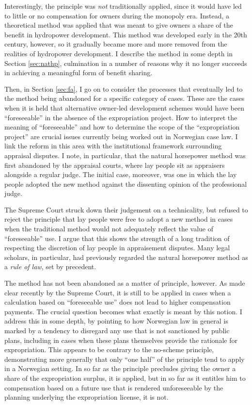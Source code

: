 Interestingly, the principle was {\it not} traditionally applied, since it would have led to little or no compensation for owners during the monopoly era. Instead, a theoretical method was applied that was meant to give owners a share of the benefit in hydropower development. This method was developed early in the 20th century, however, so it gradually became more and more removed from the realities of hydropower development. I describe the method in some depth in Section \ref{sec:nathp}, culmination in a number of reasons why it no longer succeeds in achieving a meaningful form of benefit sharing.

Then, in Section \ref{sec:fa}, I go on to consider the processes that eventually led to the method being abandoned for a specific category of cases. These are the cases when it is held that alternative owner-led development schemes would have been ``foreseeable'' in the absence of the expropriation project. How to interpret the meaning of ``foreseeable'' and how to determine the scope of the ``expropriation project'' are crucial issues currently being worked out in Norwegian case law.
I link the reform in this area with the institutional framework surrounding appraisal disputes. I note, in particular, that the natural horsepower method was first abandoned by the appraisal courts, where lay people sit as appraisers alongside a regular judge. The initial case, moreover, was one in which the lay people adopted the new method against the dissenting opinion of the professional judge.

The Supreme Court struck down their judgement on a technicality, but refused to reject the principle that lay people were free to adopt a new method in cases when the traditional method would not adequately reflect the value of ``foreseeable'' use. I argue that this shows the strength of a long tradition of respecting the discretion of lay people in appraisement disputes. Many legal scholars, in particular, had previously regarded the natural horsepower method as a {\it rule of law}, set by precedent.

The method has not been abandoned as a matter of principle, however. As made clear recently by the Supreme Court, it is still to be applied in cases when a calculation based on ``foreseeable use'' does not lead to higher compensation payments. The crucial question becomes what exactly is meant by this notion. I address this in some depth, by pointing to how Norwegian law in general is  marked by a tendency to disregard any use that is not sanctioned by public plans, including in cases when these plans themselves provide the rationale for expropriation. This appears to be contrary to the no-scheme principle, demonstrating more generally that only ``one half'' of the principle tend to apply in a Norwegian setting. In so far as the principle precludes giving the owner a share of the expropriation surplus, it is applied, but in so far as it entitles him to compensation based on a future use that is rendered unforeseeable by the planning underlying the expropriation license, it is not.

